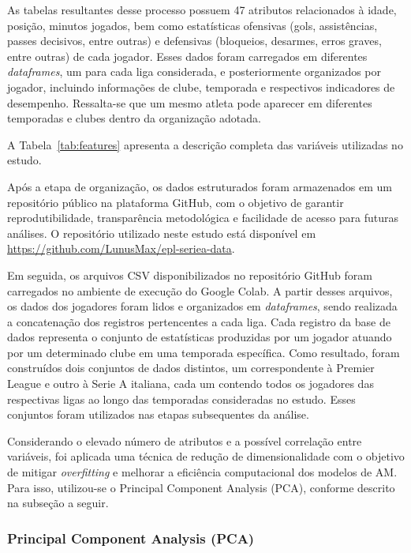 

As tabelas resultantes desse processo possuem 47 atributos relacionados à idade, posição, minutos jogados, bem como estatísticas ofensivas 
(gols, assistências, passes decisivos, entre outras) e defensivas (bloqueios, desarmes, erros graves, entre outras) de cada jogador. 
Esses dados foram carregados em diferentes \textit{dataframes}, um para cada liga considerada, e posteriormente organizados por jogador, 
incluindo informações de clube, temporada e respectivos indicadores de desempenho. Ressalta-se que um mesmo atleta pode aparecer em diferentes temporadas e clubes 
dentro da organização adotada.

A Tabela~\ref{tab:features} apresenta a descrição completa das variáveis utilizadas no estudo.



Após a etapa de organização, os dados estruturados foram armazenados em um repositório público na plataforma GitHub, com o objetivo de garantir reprodutibilidade, 
transparência metodológica e facilidade de acesso para futuras análises. O repositório utilizado neste estudo está disponível em 
\url{https://github.com/LunusMax/epl-seriea-data}.

Em seguida, os arquivos CSV disponibilizados no repositório GitHub foram carregados no ambiente de execução do Google Colab. A partir desses arquivos, 
os dados dos jogadores foram lidos e organizados em \textit{dataframes}, sendo realizada a concatenação dos registros pertencentes a cada liga. 
Cada registro da base de dados representa o conjunto de estatísticas produzidas por um jogador atuando por um determinado clube em uma temporada específica. 
Como resultado, foram construídos dois conjuntos de dados distintos, um correspondente à Premier League e outro à Serie A italiana, cada um contendo 
todos os jogadores das respectivas ligas ao longo das temporadas consideradas no estudo. Esses conjuntos foram utilizados nas etapas subsequentes da análise.

Considerando o elevado número de atributos e a possível correlação entre variáveis, foi aplicada uma técnica de redução de dimensionalidade com o objetivo de mitigar 
\textit{overfitting} e melhorar a eficiência computacional dos modelos de AM. Para isso, utilizou-se o Principal Component Analysis (PCA), conforme 
descrito na subseção a seguir.

\subsubsection{Principal Component Analysis (PCA)}

